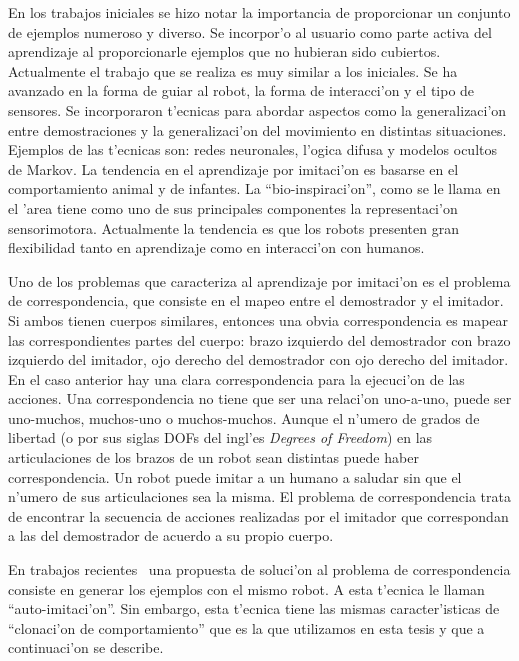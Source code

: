 \documentclass[11pt]{article}
\begin{document}
En los trabajos iniciales se hizo notar la importancia de proporcionar un conjunto de ejemplos numeroso y diverso. Se incorpor'o al usuario como parte activa del aprendizaje al proporcionarle ejemplos que no hubieran sido cubiertos. Actualmente el trabajo que se realiza es muy similar a los iniciales. Se ha avanzado en la forma de guiar al robot, la forma de interacci'on y el tipo de sensores. Se incorporaron t'ecnicas para abordar aspectos como la generalizaci'on entre demostraciones y la generalizaci'on del movimiento en distintas situaciones. Ejemplos de las t'ecnicas son: redes neuronales, l'ogica difusa y modelos ocultos de Markov. La tendencia en el \textsf{aprendizaje por imitaci'on} es basarse en el comportamiento animal y de infantes. La ``bio-inspiraci'on'', como se le llama en el 'area tiene como uno de sus principales componentes la representaci'on sensorimotora. Actualmente la tendencia es que los robots presenten gran flexibilidad tanto en aprendizaje como en interacci'on con humanos. 

Uno de los problemas que caracteriza al \textsf{aprendizaje por imitaci'on} es el problema de correspondencia, que consiste en el mapeo entre el demostrador y el imitador. Si ambos tienen cuerpos similares, entonces una obvia correspondencia es mapear las correspondientes partes del cuerpo: brazo izquierdo del demostrador con brazo izquierdo del imitador, ojo derecho del demostrador con ojo derecho del imitador. En el caso anterior hay una clara correspondencia para la ejecuci'on de las acciones. Una correspondencia no tiene que ser una relaci'on uno-a-uno, puede ser uno-muchos, muchos-uno o muchos-muchos. Aunque el n'umero de grados de libertad (o por sus siglas DOFs del ingl'es \textit{Degrees of Freedom}) en las articulaciones de los brazos de un robot sean distintas puede haber correspondencia. Un robot puede imitar a un humano a saludar sin que el n'umero de sus articulaciones sea la misma. El problema de correspondencia trata de encontrar la secuencia de acciones realizadas por el imitador que correspondan a las del demostrador de acuerdo a su propio cuerpo.

En trabajos recientes~\cite{saunders:self} una propuesta de soluci'on al problema de correspondencia consiste en generar los ejemplos con el mismo robot. A esta t'ecnica le llaman ``auto-imitaci'on''. Sin embargo, esta t'ecnica tiene las mismas caracter'isticas de ``clonaci'on de comportamiento'' que es la que utilizamos en esta tesis y que a continuaci'on se describe.
\end{document}

